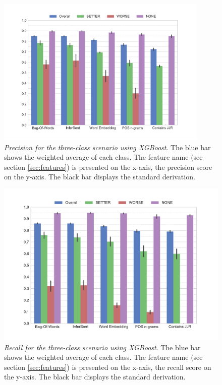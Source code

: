 \begin{figure}[tb]
         \caption{\emph{Precision for the three-class scenario using XGBoost}. The blue bar shows the weighted average of each class. The feature name (see section \ref{sec:features}) is presented on the x-axis, the precision score on the y-axis. The black bar displays the standard derivation.} 
    \label{fig:3_precision}
 \centering
	\includegraphics[width=0.9\textwidth]{images/experiments/precision-False}
\end{figure}

  \begin{figure}[p]
              \caption{\emph{Recall for the three-class scenario using XGBoost}. The blue bar shows the weighted average of each class. The feature name (see section \ref{sec:features}) is presented on the x-axis, the recall score on the y-axis. The black bar displays the standard derivation.} 
       \label{fig:3_recall}
 \centering
	\includegraphics[width=1\textwidth]{images/experiments/recall-False}
\end{figure}



